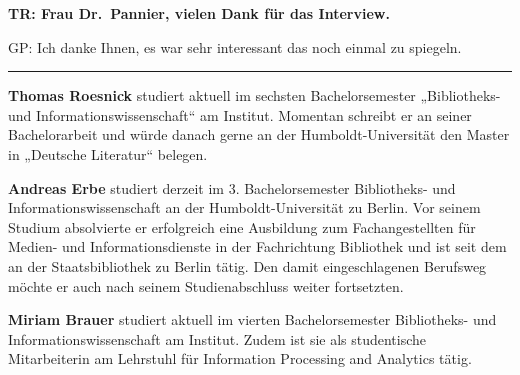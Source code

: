 \documentclass[a4paper,
fontsize=11pt,
oneside,
numbers=noperiodatend,
parskip=half-,
bibliography=totoc,
final
]{scrartcl}
\begin{document}
\textbf{TR: Frau Dr.~Pannier, vielen Dank für das Interview.}

GP: Ich danke Ihnen, es war sehr interessant das noch einmal zu
spiegeln.

\begin{center}\rule{0.5\linewidth}{\linethickness}\end{center}

\textbf{Thomas Roesnick} studiert aktuell im sechsten Bachelorsemester
„Bibliotheks- und Informationswissenschaft`` am Institut. Momentan
schreibt er an seiner Bachelorarbeit und würde danach gerne an der
Humboldt-Universität den Master in „Deutsche Literatur`` belegen.

\textbf{Andreas Erbe} studiert derzeit im 3. Bachelorsemester
Bibliotheks- und Informationswissenschaft an der Humboldt-Universität zu
Berlin. Vor seinem Studium absolvierte er erfolgreich eine Ausbildung
zum Fachangestellten für Medien- und Informationsdienste in der
Fachrichtung Bibliothek und ist seit dem an der Staatsbibliothek zu
Berlin tätig. Den damit eingeschlagenen Berufsweg möchte er auch nach
seinem Studienabschluss weiter fortsetzten.

\textbf{Miriam Brauer} studiert aktuell im vierten Bachelorsemester
Bibliotheks- und Informationswissenschaft am Institut. Zudem ist sie als
studentische Mitarbeiterin am Lehrstuhl für Information Processing and
Analytics tätig.
\end{document}
